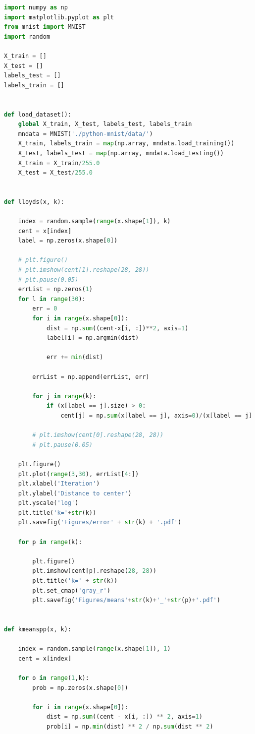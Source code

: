 \documentclass{article}
\newcommand{\1}{\mathbf{1}}
\begin{document}
\begin{lstlisting}[language=Python]
import numpy as np
import matplotlib.pyplot as plt
from mnist import MNIST
import random

X_train = []
X_test = []
labels_test = []
labels_train = []


def load_dataset():
    global X_train, X_test, labels_test, labels_train
    mndata = MNIST('./python-mnist/data/')
    X_train, labels_train = map(np.array, mndata.load_training())
    X_test, labels_test = map(np.array, mndata.load_testing())
    X_train = X_train/255.0
    X_test = X_test/255.0


def lloyds(x, k):

    index = random.sample(range(x.shape[1]), k)
    cent = x[index]
    label = np.zeros(x.shape[0])

    # plt.figure()
    # plt.imshow(cent[1].reshape(28, 28))
    # plt.pause(0.05)
    errList = np.zeros(1)
    for l in range(30):
        err = 0
        for i in range(x.shape[0]):
            dist = np.sum((cent-x[i, :])**2, axis=1)
            label[i] = np.argmin(dist)

            err += min(dist)

        errList = np.append(errList, err)

        for j in range(k):
            if (x[label == j].size) > 0:
                cent[j] = np.sum(x[label == j], axis=0)/(x[label == j].size)

        # plt.imshow(cent[0].reshape(28, 28))
        # plt.pause(0.05)

    plt.figure()
    plt.plot(range(3,30), errList[4:])
    plt.xlabel('Iteration')
    plt.ylabel('Distance to center')
    plt.yscale('log')
    plt.title('k='+str(k))
    plt.savefig('Figures/error' + str(k) + '.pdf')

    for p in range(k):

        plt.figure()
        plt.imshow(cent[p].reshape(28, 28))
        plt.title('k=' + str(k))
        plt.set_cmap('gray_r')
        plt.savefig('Figures/means'+str(k)+'_'+str(p)+'.pdf')


def kmeanspp(x, k):

    index = random.sample(range(x.shape[1]), 1)
    cent = x[index]

    for o in range(1,k):
        prob = np.zeros(x.shape[0])

        for i in range(x.shape[0]):
            dist = np.sum((cent - x[i, :]) ** 2, axis=1)
            prob[i] = np.min(dist) ** 2 / np.sum(dist ** 2)


\end{lstlisting}
\end{document}
